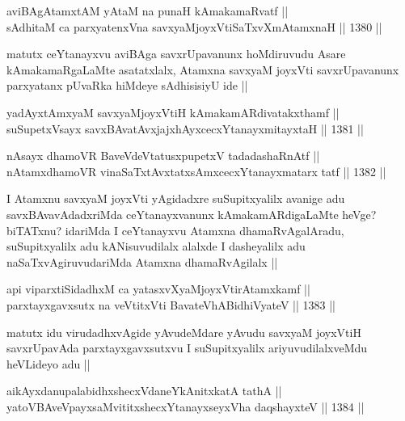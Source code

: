 \begin{shl}
aviBAgAtamxtAM yAtaM na punaH kAmakamaRvatf || \\
sAdhitaM ca parxyatenxVna savxyaMjoyxVtiSaTxvXmAtamxnaH ||  1380 ||  
\end{shl}

\begin{artha}
matutx ceYtanayxvu aviBAga savxrUpavanunx hoMdiruvudu Asare kAmakamaRgaLaMte asatatxlalx, Atamxna savxyaM joyxVti savxrUpavanunx parxyatanx pUvaRka hiMdeye sAdhisisiyU ide ||
\end{artha}


\begin{shl}
yadAyxtAmx\s yaM savxyaMjoyxVtiH kAmakamARdivatakxthamf || \\
suSupetxV\s sayx savxBAvatAvxjajxhAyxcecxYtanayxmitayxtaH ||  1381 ||  
\end{shl}
				
\begin{shl}
nAsayx dhamoVR BaveVdeVtatusxpupetxV tadadashaRnAtf ||  \\
nA\s \s tamxdhamoVR vinaSaTxtAvxtatxsAmxcecxYtanayxmatarx tatf ||  1382 ||  
\end{shl}

\begin{artha}
I Atamxnu savxyaM joyxVti yAgidadxre suSupitxyalilx avanige adu savxBAvavAdadxriMda ceYtanayxvanunx kAmakamARdigaLaMte heVge? biTATxnu? idariMda I ceYtanayxvu Atamxna dhamaRvAgalAradu, suSupitxyalilx adu kANisuvudilalx alalxde I dasheyalilx adu naSaTxvAgiruvudariMda Atamxna dhamaRvAgilalx ||
\end{artha}

\begin{shl}
api viparxtiSidadhxM ca yatasxvXyaMjoyxVtirAtamxkamf || \\
parxtayxgavxsutx na veVtitxVti BavateVhABidhiVyateV ||  1383 ||  
\end{shl}

\begin{artha}
matutx idu virudadhxvAgide yAvudeMdare yAvudu savxyaM joyxVtiH savxrUpavAda parxtayxgavxsutxvu I suSupitxyalilx ariyuvudilalxveMdu heVLideyo adu ||
\end{artha}


\begin{shl}
aikAyxdanupalabidhxshecxVdaneYkAnitxkatA tathA || \\
yatoV\s BAveV\s payxsaMvititxshecxYtanayxseyxVha daqshayxteV ||  1384 ||  
\end{shl}

